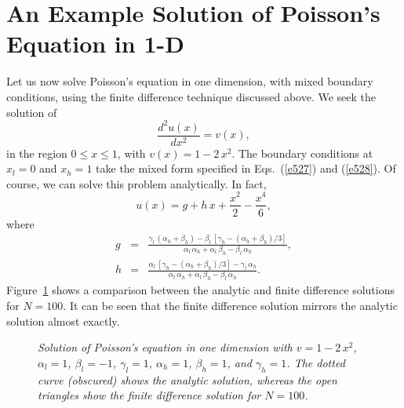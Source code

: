 \section{An Example Solution of Poisson's Equation in 1-D}
Let us now solve Poisson's equation in one dimension, with mixed boundary conditions,
using the finite difference technique discussed above. We  seek the
solution of
\begin{equation}
\frac{d^2 u(x)}{dx^2} = v(x),
\end{equation}
in the region $0\leq x\leq 1$, with $v(x) = 1 - 2\,x^2$. The boundary conditions
at $x_l=0$ and $x_h = 1$ take the mixed form specified in Eqs.~(\ref{e527}) and
(\ref{e528}). Of course, we can solve this problem analytically. In fact,
\begin{equation}
u(x) = g + h\,x + \frac{x^2}{2} - \frac{x^4}{6},
\end{equation}
where
\begin{eqnarray}
g &=& \frac{\gamma_l\,(\alpha_h+\beta_h) - \beta_l\,[\gamma_h-(\alpha_h+\beta_h)/3]}
{\alpha_l\,\alpha_h + \alpha_l\,\beta_h-\beta_l\,\alpha_h},\\[0.5ex]
h &=& \frac{ \alpha_l\,[\gamma_h-(\alpha_h+\beta_h)/3]-\gamma_l\,\alpha_h}
{\alpha_l\,\alpha_h + \alpha_l\,\beta_h-\beta_l\,\alpha_h}.
\end{eqnarray}
Figure~\ref{f5x1} shows a comparison between the analytic and finite difference
solutions for $N=100$. It can be seen that the finite difference solution mirrors
the analytic solution almost exactly.

\begin{figure}
\epsfysize=3in
\centerline{}
\caption{\em Solution of Poisson's equation  in one dimension  with $v=1-2\,x^2$, $\alpha_l = 1$, $\beta_l=-1$,
$\gamma_l=1$, $\alpha_h=1$, $\beta_h=1$, and $\gamma_h=1$. The dotted curve (obscured)
shows the analytic solution, whereas the open triangles show the finite difference
solution for $N=100$.  }\label{f5x1}
\end{figure}

